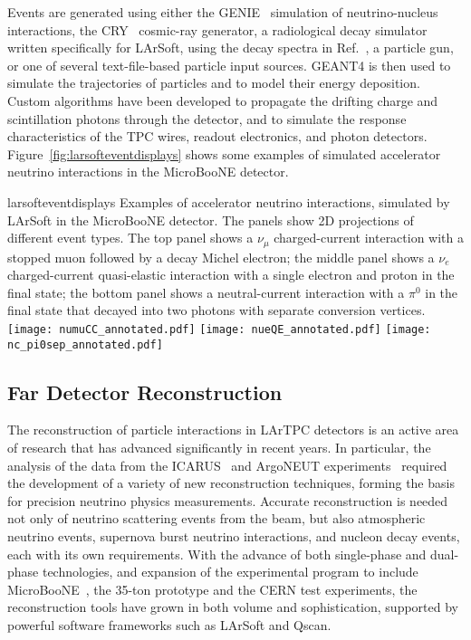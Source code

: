 Events are generated using either the GENIE~\cite{GENIE} simulation of 
neutrino-nucleus interactions, the CRY~\cite{Cosmic-CRY,Cosmic-CRY-protons,CRY-url} cosmic-ray generator, 
a radiological decay simulator written specifically for LArSoft, using the decay spectra
in Ref.~\cite{docdb-8797}, a particle gun, or one of several
text-file-based particle input sources. GEANT4 is then used to simulate the trajectories
of particles and to model their energy deposition.  
Custom algorithms have been developed to propagate the drifting charge
and scintillation photons through the detector, and to simulate the
response characteristics of the TPC wires, readout electronics, and photon detectors.
Figure~\ref{fig:larsofteventdisplays} shows some examples of simulated 
accelerator neutrino interactions in the MicroBooNE detector.

\begin{cdrfigure}{larsofteventdisplays}
{Examples of accelerator neutrino interactions, simulated by LArSoft in the 
MicroBooNE detector. The panels show 2D projections of different event types.
The top panel shows a $\nu_{\mu}$ charged-current interaction with a stopped muon followed
by a decay Michel electron; the middle panel shows a $\nu_{e}$ charged-current 
quasi-elastic interaction with a single electron and proton in the final state;
the bottom panel shows a neutral-current interaction with a $\pi^{0}$ in the final state
that decayed into two photons with separate conversion vertices.}
\texttt{[image: numuCC\_annotated.pdf]}
\texttt{[image: nueQE\_annotated.pdf]}
\texttt{[image: nc\_pi0sep\_annotated.pdf]}
\end{cdrfigure}

\subsection{Far Detector Reconstruction}
\label{sec:detectors-sc-physics-software-reconstruction-fd}

The reconstruction of particle interactions in LArTPC
detectors is an active area of research that has advanced significantly in recent years.
In particular, the analysis of the data from the ICARUS~\cite{Amerio:2004ze,icarus-url,ICARUS-pizero,Antonello:2012hu} 
and ArgoNEUT experiments~\cite{Adamson:2013/02/28tla,argoneut-url,Acciarri:2013met}
required the development of a variety of new reconstruction techniques,
forming the basis for precision neutrino physics measurements.
Accurate reconstruction is needed not only of neutrino scattering events from the beam, but also atmospheric neutrino events,
supernova burst neutrino interactions, and nucleon decay events, each with its own requirements.
With the advance of both single-phase and dual-phase technologies,
and expansion of the experimental program to include MicroBooNE~\cite{Chen:2007ae,microboone-url},
the 35-ton prototype and the CERN test experiments,
the reconstruction tools have grown in both volume and sophistication,
supported by powerful software frameworks such as LArSoft and Qscan.

